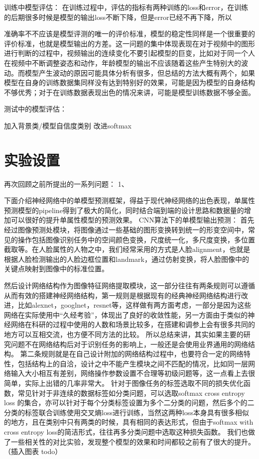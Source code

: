 训练中模型评估：
在训练过程中，评估的指标有两种训练的loss和error，在训练的后期很多时候是模型的输出loss不断下降，但是error已经不再下降，所以

准确率不不应该是模型评测的唯一的评价标准，模型的稳定性同样是一个很重要的评价标准，也就是模型输出的方差。这一问题的集中体现表现在对于视频中的图形进行判断的过程中，视频输出的连续变化不要引起模型的巨变，比如对于同一个人在视频中不断调整姿态和动作，年龄模型的输出不应该随着这些产生特别大的波动。而模型产生波动的原因可能具体分析有很多，但总结的方法大概有两个，如果模型在自身的训练数据集同样没有达到特别好的效果，可能是因为模型的自身结构不够优秀；对于在训练数据表现出色的情况来讲，可能是模型训练数据不够全面。


测试中的模型评估：

加入背景类/模型自信度类别
改进softmax 

\section{实验设置}
再次回顾之前所提出的一系列问题：
1、

下面介绍神经网络中的单模型预测框架，得益于现代神经网络的出色表现，单属性预测模型的pipeline得到了极大的简化，同时结合端到端的设计思路和数据量的增加可以很好的提升单属性模型的预测效果。
CNN算法下的单模型输出预测：
首先经过图像预测处模块，将图像通过一些基础的图形变换转到统一的形变空间中，常见的操作包括图像识别任务中的空间颜色变换，尺度统一化，多尺度变换，多位置截取等。在人脸属性的人物之中，我们经常采用的方式是人脸alignment，也就是根据人脸检测输出的人脸边框位置和landmark，通过仿射变换，将人脸图像中的关键点映射到图像中的标准位置。

然后设计网络结构作为图像特征网络提取模块，这一部分往往有两条规则可以遵循从而有效的搭建神经网络结构，第一规则是根据现有的经典神经网络结构进行改进，比如alexnet，googlnet，resnet等，这样做有两方面考虑，一部分是因为这些网络在实际使用中“久经考验”，体现出了良好的收敛性能，另一方面由于类似的神经网络在科研的过程中使用的人数和场景比较多，在搭建和调参上会有很多共同的地方可以互相交流，也方便不同方法的比较。
所以总结来讲，其实如果主要的研究问题不在网络结构后对于识别任务的影响上，一般还是会使用业界通用的网络结构。
第二条规则就是在自己设计附加的网络结构过程中，也要符合一定的网络特性，包括结构上的自洽，设计之中不能产生模块之间不匹配的情况，比如同一层网络输入大小相互有差别，网络操作参数设置不合理等初级问题等，这一点看上去很简单，实际上出错的几率非常大。
针对于图像任务的标签选取不同的损失优化函数，常见针对于非连续的数据标签如分类问题，可以选取softmax cross entropy loss	的集合，亦可以针对于每个分类标签设置为多个二分类的问题，然后多个的二分类的标签联合训练使用交叉熵loss进行训练，当然这两种loss本身具有很多相似的地方，且在类别中只有两类的时候，具有相同的表达形式，但由于softmax with cross entropy loss的简洁形式，往往再多分类问题中选取这种损失函数。
我们也做了一些相关性的对比实验，发现整个模型的效果和时间都较之前有了很大的提升。
（插入图表 todo）


